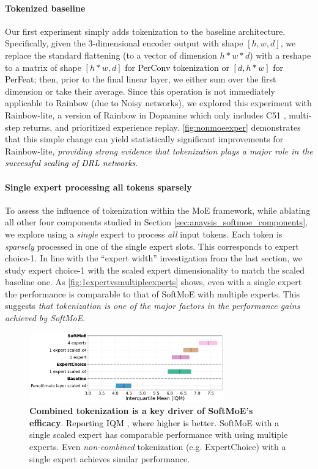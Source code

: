 \documentclass{article} %
\newcommand{\rebuttal}[1]{\textcolor{black}{#1}}
\begin{document}
\paragraph{Tokenized baseline} Our first experiment simply adds tokenization to the baseline architecture. Specifically, given the 3-dimensional encoder output with shape $[h, w, d]$, we replace the standard flattening (to a vector of dimension $h*w*d$) with a reshape to a matrix of shape $[h*w, d]$ \rebuttal{for PerConv tokenization or $[d, h*w]$ for PerFeat}; then, prior to the final linear layer, we either sum over the first dimension or take their average. Since this operation is not immediately applicable to Rainbow (due to Noisy networks), we explored this experiment with Rainbow-lite, a version of Rainbow in Dopamine which only includes C51 \citep{bellemare2017distributional}, multi-step returns, and prioritized experience replay. \autoref{fig:nonmoeexper} demonstrates that this simple change can yield statistically significant improvements for Rainbow-lite, {\em providing strong evidence that tokenization plays a major role in the \rebuttal{ successful scaling of DRL networks}}.



\paragraph{Single expert processing all tokens sparsely} To assess the influence of tokenization within the MoE framework, while ablating all other four components studied in Section \ref{sec:anaysis_softmoe_components}, we explore using a \textit{single} expert to process \textit{all} input tokens. Each token is \textit{sparsely} processed in one of the single expert slots. This corresponds to expert choice-1. In line with the ``expert width'' investigation from the last section, we study expert choice-1 with the scaled expert dimensionality to match the scaled baseline one. As \autoref{fig:1expertvsmultipleexperts} shows, even with a single expert the performance is comparable to that of SoftMoE with multiple experts. This suggests \textit{that tokenization is one of the major factors in the performance gains achieved by SoftMoE}. 

\begin{figure}[!b]
    \centering
    \includegraphics[width=0.75\textwidth]{figures/results/section5_aggregate_v2_4experts.pdf}
    \caption{\textbf{Combined tokenization is a key driver of SoftMoE's efficacy}. \rebuttal{Reporting IQM \citep{agarwal2021deep}, where higher is better.} SoftMoE with a single scaled expert has comparable performance with using multiple experts. Even \textit{non-combined} tokenization (e.g. ExpertChoice) with a single expert achieves similar performance.}
    \label{fig:1expertvsmultipleexperts}
\end{figure}
\end{document}
